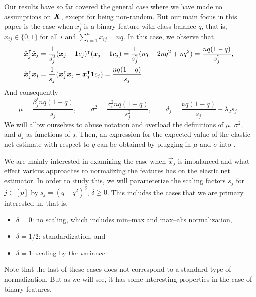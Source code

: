 Our results have so far covered the general case where we have made no assumptions on \(\boldsymbol{X}\), except for being non-random. But our main focus in this paper
is the case when \(\vec{x_j}\) is a binary feature with class balance \(q\), that is, \(x_{ij} \in \{0, 1\}\) for all \(i\) and \(\sum_{i=1}^n x_{ij} = nq\).
In this case, we observe that
\[
  \begin{aligned}
    \tilde{\boldsymbol{x}}_j^\intercal \tilde{\boldsymbol{x}}_j & = \frac{1}{s_j^2}(\boldsymbol{x}_j - \boldsymbol{1} c_j)^\intercal (\boldsymbol{x}_j - \boldsymbol{1} c_j) = \frac{1}{s^2_j}(nq - 2nq^2 + nq^2) = \frac{nq(1-q)}{s^2_j}, \\
    \tilde{\boldsymbol{x}}_j^\intercal \boldsymbol{x}_j         & = \frac{1}{s_j}(\boldsymbol{x}_j^\intercal \boldsymbol{x}_j - \boldsymbol{x}_j^\intercal \boldsymbol{1} c_j) = \frac{nq(1 - q)}{s_j}.
  \end{aligned}
\]
And consequently
\[
  \mu = \frac{\beta^*_j nq(1 - q)}{s_j}, \qquad \sigma^2 = \frac{\sigma_\varepsilon^2nq(1 - q)}{s^2_j}, \qquad d_j = \frac{nq(1 -q)}{s_j}  + \lambda_2 s_j.
\]
We will allow ourselves to abuse notation and overload the definitions of \(\mu\), \(\sigma^2\), and \(d_j\) as functions of \(q\). Then, an expression for the expected value of the elastic net estimate with respect to \(q\) can be obtained by plugging in \(\mu\) and \(\sigma\) into .

We are mainly interested in examining the case when \(\vec{x}_j\) is imbalanced and what effect various approaches to normalizing the features
has on the elastic net estimator. In order to study this, we will parameterize the scaling factors \(s_j\) for \(j  \in [p]\) by \(s_j = (q - q^2)^\delta\), \(\delta \geq 0\).
This includes the cases that we are primary interested in, that is,
\begin{itemize}
  \item \(\delta = 0\): no scaling, which includes min--max and max--abs normalization,
  \item \(\delta = 1/2\): standardization, and
  \item \(\delta = 1\): scaling by the variance.
\end{itemize}
Note that the last of these cases does not correspond to a standard type of normalization. But as we will see, it has some interesting properties in the case of binary features.

